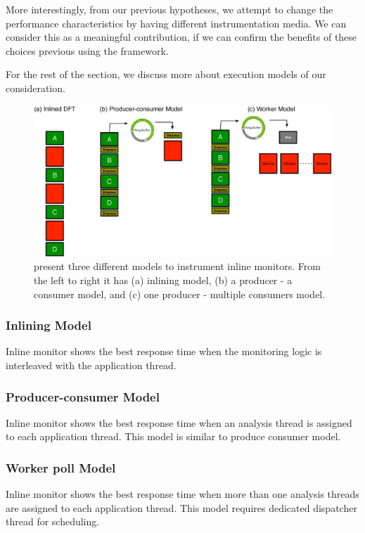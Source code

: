 More interestingly, from our previous hypotheses, we attempt to change the
performance characteristics by having different instrumentation media. We can
consider this as a meaningful contribution, if we can confirm the benefits of
these choices previous using the framework.

For the rest of the section, we discuss more about execution models of our
consideration.

\begin{figure}[tb]
    \centering
    \includegraphics[width=0.90\linewidth]{figs/model0.eps}

    \caption{present three different models to instrument inline monitors. From
    the left to right it has (a) inlining model, (b) a producer - a consumer
    model, and (c) one producer - multiple consumers model.\label{fig:model0}}

\end{figure}

\subsubsection{Inlining Model}

Inline monitor shows the best response time when the monitoring logic is
interleaved with the application thread.

\subsubsection{Producer-consumer Model}

Inline monitor shows the best response time when an analysis thread is assigned
to each application thread. This model is similar to produce consumer model.

\subsubsection{Worker poll Model}

Inline monitor shows the best response time when more than one analysis threads
are assigned to each application thread. This model requires dedicated
dispatcher thread for scheduling.
